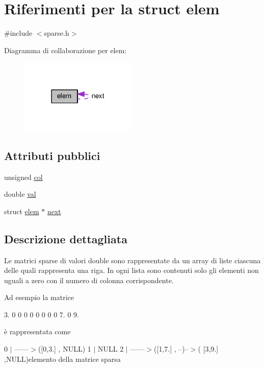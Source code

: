 \hypertarget{structelem}{}\section{Riferimenti per la struct elem}
\label{structelem}


{\ttfamily \#include $<$sparse.\+h$>$}



Diagramma di collaborazione per elem\+:\nopagebreak
\begin{figure}[H]
\begin{center}
\leavevmode
\includegraphics[width=158pt]{structelem__coll__graph}
\end{center}
\end{figure}
\subsection*{Attributi pubblici}
\begin{DoxyCompactItemize}
\item 
unsigned \hyperlink{structelem_aca409f3a7c1c9621b262a230c78ef37b}{col}
\item 
double \hyperlink{structelem_a52a0b099052bdf7611aa32acdb3f5449}{val}
\item 
struct \hyperlink{structelem}{elem} $\ast$ \hyperlink{structelem_ab9cf5c2e1c9a0ec2938275b90d39d5ca}{next}
\end{DoxyCompactItemize}


\subsection{Descrizione dettagliata}
Le matrici sparse di valori double sono rappresentate da un array di liste ciascuna delle quali rappresenta una riga. In ogni lista sono contenuti solo gli elementi non uguali a zero con il numero di colonna corrispondente.

Ad esempio la matrice

3. 0 0 0 0 0 0 0 0 7. 0 9.

è rappresentata come

0 $\vert$ ------$>$(\mbox{[}0,3.\mbox{]} , N\+U\+LL) 1 $\vert$ N\+U\+LL 2 $\vert$ ------$>$(\mbox{[}1,7.\mbox{]} , --)--$>$( \mbox{[}3,9.\mbox{]} ,N\+U\+LL)elemento della matrice sparsa 

